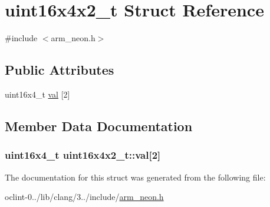 \hypertarget{structuint16x4x2__t}{\section{uint16x4x2\-\_\-t Struct Reference}
\label{structuint16x4x2__t}
}


{\ttfamily \#include $<$arm\-\_\-neon.\-h$>$}

\subsection*{Public Attributes}
\begin{DoxyCompactItemize}
\item 
uint16x4\-\_\-t \hyperlink{structuint16x4x2__t_a79a3ee2d9f9bbb3fc7a917faa38faa1a}{val} \mbox{[}2\mbox{]}
\end{DoxyCompactItemize}


\subsection{Member Data Documentation}
\hypertarget{structuint16x4x2__t_a79a3ee2d9f9bbb3fc7a917faa38faa1a}{
\subsubsection[{val}]{\setlength{\rightskip}{0pt plus 5cm}uint16x4\-\_\-t uint16x4x2\-\_\-t\-::val\mbox{[}2\mbox{]}}}\label{structuint16x4x2__t_a79a3ee2d9f9bbb3fc7a917faa38faa1a}


The documentation for this struct was generated from the following file\-:\begin{DoxyCompactItemize}
\item 
oclint-\/0../lib/clang/3../include/\hyperlink{arm__neon_8h}{arm\-\_\-neon.\-h}\end{DoxyCompactItemize}

